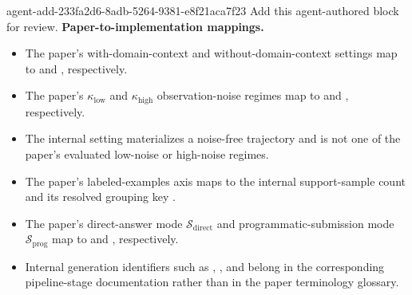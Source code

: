 \documentclass[11pt]{article}
\begin{document}
\agentProposedEdit
  {agent-add-233fa2d6-8adb-5264-9381-e8f21aca7f23}
  {Add this agent-authored block for review.}
  {}
  {\textbf{Paper-to-implementation mappings.}}
\begin{itemize}
\item The paper's with-domain-context and without-domain-context settings map to  and , respectively.
\item The paper's \(\kappa_{\mathrm{low}}\) and \(\kappa_{\mathrm{high}}\) observation-noise regimes map to  and , respectively.
\item The internal  setting materializes a noise-free trajectory and is not one of the paper's evaluated low-noise or high-noise regimes.
\item The paper's labeled-examples axis maps to the internal support-sample count  and its resolved grouping key .
\item The paper's direct-answer mode \(\mathcal{S}_{\mathrm{direct}}\) and programmatic-submission mode \(\mathcal{S}_{\mathrm{prog}}\) map to  and , respectively.
\item Internal generation identifiers such as , , and  belong in the corresponding pipeline-stage documentation rather than in the paper terminology glossary.
\end{itemize}
\end{document}

